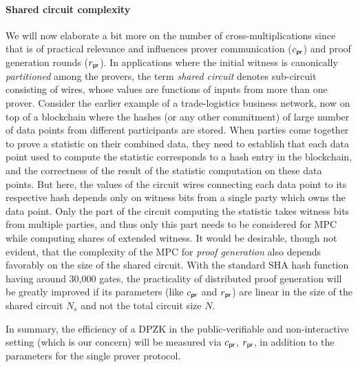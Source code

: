 \paragraph{Shared circuit complexity}
We will now elaborate a bit more on the number of cross-multiplications since
that is of practical relevance and influences prover communication ($c_\mathsf{pr}$)
and proof generation rounds ($r_\mathsf{pr}$). In applications where the initial
witness is canonically \textit{partitioned} among the provers, the term
\textit{shared circuit} denotes sub-circuit consisting of wires, whose 
values are functions of inputs from more than one prover. 
Consider the earlier example of a trade-logistics business network, now on top of 
a blockchain where the hashes (or any other commitment) of large number of data points
from different participants are stored. 
When parties come together to prove a statistic on their combined data, they
need to establish that each data point used to compute the statistic corresponds to a 
hash entry in the blockchain, and the correctness of the result of the statistic
computation on these data points. But here, the values of the circuit wires
connecting each data point to its respective hash depends only on witness bits from a 
single party which owns the data point. Only the part of the circuit computing the 
statistic takes witness bits from multiple parties, and thus only this part
needs to be considered for MPC while computing shares of extended witness. It
would be desirable, though not evident, that the complexity of the MPC for {\em proof
generation} also depends favorably on the size of the shared circuit. 
With the standard SHA hash function having around 30,000 gates, the practicality of 
distributed proof generation will be
greatly improved if its parameters (like $c_\mathsf{pr}$ and $r_\mathsf{pr}$) are 
linear in the size of the shared circuit $N_s$ and not the total circuit size $N$.

In summary, the efficiency of a DPZK in the public-verifiable and
non-interactive setting (which is our concern) will be measured via $c_\mathsf{pr}$,
$r_\mathsf{pr}$, in addition to the parameters for the single prover protocol.

